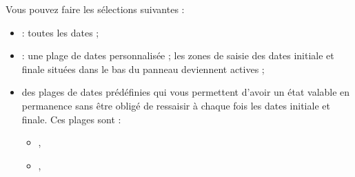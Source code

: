 Vous pouvez faire les sélections suivantes :
\begin{itemize}
	\ifIllustration
	\label{reportcreation-datas-dates-img}
	\fi
	\item {} : toutes les dates ;
	\item {} : une plage de dates personnalisée ; les zones de saisie des dates initiale et finale situées dans le bas du panneau deviennent actives ;
	\item des plages de dates prédéfinies qui vous permettent d'avoir un état valable en permanence sans être obligé de ressaisir à chaque fois les dates initiale et finale. Ces plages sont : 
	    \begin{itemize}
		\item {},
		\item {},

\end{itemize}
\end{itemize}
